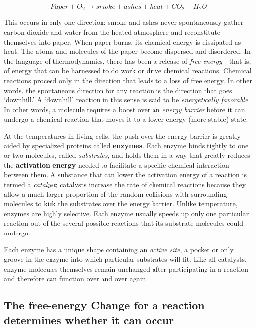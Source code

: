 \begin{equation}
Paper + O_{2} \rightarrow smoke + ashes + heat + CO_{2} + H_{2}O
\end{equation}

This occurs in only one direction: smoke and ashes never spontaneously
gather carbon dioxide and water from the heated atmosphere and
reconstitute themselves into paper. When paper burns, its chemical
energy is dissipated as heat. The atoms
and molecules of the paper become dispersed and disordered. In the
language of thermodynamics, there has been a release of \textit{free energy} -
that is, of energy that can be harnessed to do work or drive chemical
reactions. Chemical reactions proceed only in the direction that leads to
a loss of free energy. In other words, the spontaneous direction for any
reaction is the direction that goes ‘downhill.’ A ‘downhill’ reaction in this
sense is said to be \textit{energetically favorable}.
In other words, a molecule requires a boost over an \textit{energy barrier}
before it can undergo a chemical reaction that moves it to a lower-energy
(more stable) state.

At the temperatures in living cells, the push over the energy barrier is
greatly aided by specialized proteins called \textbf{enzymes}. Each enzyme binds
tightly to one or two molecules, called \textit{substrates}, and holds them in
a way that greatly reduces the \textbf{activation energy} needed to facilitate a
specific chemical interaction between them. A substance
that can lower the activation energy of a reaction is termed a \textit{catalyst};
catalysts increase the rate of chemical reactions because they allow a
much larger proportion of the random collisions with surrounding molecules
to kick the substrates over the energy barrier.
Unlike temperature, enzymes are highly selective. Each enzyme usually
speeds up only one particular reaction out of the several possible reactions
that its substrate molecules could undergo.

Each enzyme has a unique shape containing an \textit{active site}, a pocket or only
groove in the enzyme into which particular substrates will fit.
Like all catalysts, enzyme molecules themselves remain unchanged
after participating in a reaction and therefore can function over and over
again.

\subsection{The free-energy Change for a reaction determines whether it can occur}

